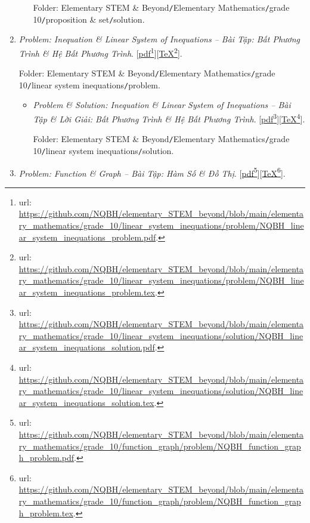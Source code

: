 \documentclass[12pt,twoside]{book}
\begin{document}
\begin{enumerate}
\begin{itemize}
		Folder: {\sf Elementary STEM \& Beyond{\tt/}Elementary Mathematics{\tt/}grade 10{\tt/}proposition \& set{\tt/}solution}.
	\end{itemize}
	\item {\it Problem: Inequation \& Linear System of Inequations -- Bài Tập: Bất Phương Trình \& Hệ Bất Phương Trình}. [\href{https://github.com/NQBH/elementary_STEM_beyond/blob/main/elementary_mathematics/grade_10/linear_system_inequations/problem/NQBH_linear_system_inequations_problem.pdf}{pdf}\footnote{{\sc url}: \url{https://github.com/NQBH/elementary_STEM_beyond/blob/main/elementary_mathematics/grade_10/linear_system_inequations/problem/NQBH_linear_system_inequations_problem.pdf}.}][\href{https://github.com/NQBH/elementary_STEM_beyond/blob/main/elementary_mathematics/grade_10/linear_system_inequations/problem/NQBH_linear_system_inequations_problem.tex}{\TeX}\footnote{{\sc url}: \url{https://github.com/NQBH/elementary_STEM_beyond/blob/main/elementary_mathematics/grade_10/linear_system_inequations/problem/NQBH_linear_system_inequations_problem.tex}.}].
	
	Folder: {\sf Elementary STEM \& Beyond{\tt/}Elementary Mathematics{\tt/}grade 10{\tt/}linear system inequations{\tt/}problem}.
	\begin{itemize}
		\item {\it Problem \& Solution: Inequation \& Linear System of Inequations -- Bài Tập \& Lời Giải: Bất Phương Trình \& Hệ Bất Phương Trình}. [\href{https://github.com/NQBH/elementary_STEM_beyond/blob/main/elementary_mathematics/grade_10/linear_system_inequations/solution/NQBH_linear_system_inequations_solution.pdf}{pdf}\footnote{{\sc url}: \url{https://github.com/NQBH/elementary_STEM_beyond/blob/main/elementary_mathematics/grade_10/linear_system_inequations/solution/NQBH_linear_system_inequations_solution.pdf}.}][\href{https://github.com/NQBH/elementary_STEM_beyond/blob/main/elementary_mathematics/grade_10/linear_system_inequations/solution/NQBH_linear_system_inequations_solution.tex}{\TeX}\footnote{{\sc url}: \url{https://github.com/NQBH/elementary_STEM_beyond/blob/main/elementary_mathematics/grade_10/linear_system_inequations/solution/NQBH_linear_system_inequations_solution.tex}.}].
		
		Folder: {\sf Elementary STEM \& Beyond{\tt/}Elementary Mathematics{\tt/}grade 10{\tt/}linear system inequations{\tt/}solution}.
	\end{itemize}
	\item {\it Problem: Function \& Graph  -- Bài Tập: Hàm Số \& Đồ Thị}. [\href{https://github.com/NQBH/elementary_STEM_beyond/blob/main/elementary_mathematics/grade_10/function_graph/problem/NQBH_function_graph_problem.pdf}{pdf}\footnote{{\sc url}: \url{https://github.com/NQBH/elementary_STEM_beyond/blob/main/elementary_mathematics/grade_10/function_graph/problem/NQBH_function_graph_problem.pdf}.}][\href{https://github.com/NQBH/elementary_STEM_beyond/blob/main/elementary_mathematics/grade_10/function_graph/problem/NQBH_function_graph_problem.tex}{\TeX}\footnote{{\sc url}: \url{https://github.com/NQBH/elementary_STEM_beyond/blob/main/elementary_mathematics/grade_10/function_graph/problem/NQBH_function_graph_problem.tex}.}].
	

\end{enumerate}
\end{document}
